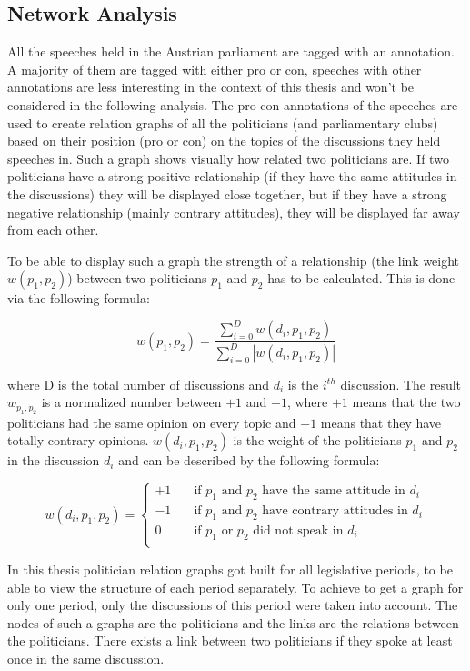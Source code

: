 \subsection{Network Analysis}
\label{sec:network_analysis}
All the speeches held in the Austrian parliament are tagged with an annotation. A majority of them are tagged with either pro or con, speeches with other annotations are less interesting in the context of this thesis and won't be considered in the following analysis. The pro-con annotations of the speeches are used to create relation graphs of all the politicians (and parliamentary clubs) based on their position (pro or con) on the topics of the discussions they held speeches in. Such a graph shows visually how related two politicians are. If two politicians have a strong positive relationship (if they have the same attitudes in the discussions) they will be displayed close together, but if they have a strong negative relationship (mainly contrary attitudes), they will be displayed far away from each other.

To be able to display such a graph the strength of a relationship (the link weight $w(p_1,p_2)$) between two politicians $p_1$ and $p_2$ has to be calculated. This is done via the following formula:

$$w(p_1,p_2) = \frac{\displaystyle\sum_{i=0}^{D} w(d_i,p_1,p_2)}{\displaystyle\sum_{i=0}^{D} |w(d_i,p_1,p_2)|}$$

where D is the total number of discussions and $d_i$ is the $i^{th}$ discussion. The result $w_{p_1,p_2}$ is a normalized number between $+1$ and $-1$, where $+1$ means that the two politicians had the same opinion on every topic and $-1$ means that they have totally contrary opinions. $w(d_i,p_1,p_2)$ is the weight of the politicians $p_1$ and $p_2$ in the discussion $d_i$ and can be described by the following formula:

$$w(d_i,p_1,p_2) = 
\begin{cases}
    +1       & \quad \text{if } p_1 \text{ and } p_2 \text{ have the same attitude in } d_i\\
    -1  & \quad \text{if } p_1 \text{ and } p_2 \text{ have contrary attitudes in } d_i\\
        0       & \quad \text{if } p_1 \text{ or } p_2 \text{ did not speak in } d_i\\
\end{cases}
$$

In this thesis politician relation graphs got built for all legislative periods, to be able to view the structure of each period separately. To achieve to get a graph for only one period, only the discussions of this period were taken into account. The nodes of such a graphs are the politicians and the links are the relations between the politicians. There exists a link between two politicians if they spoke at least once in the same discussion. 

